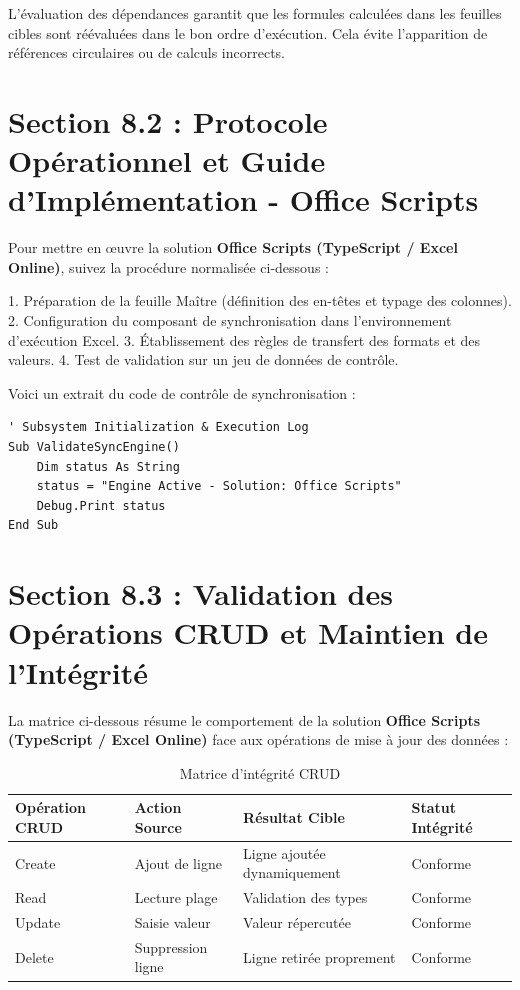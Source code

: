 \documentclass[12pt,a4paper]{report}
\begin{document}
L'évaluation des dépendances garantit que les formules calculées dans les feuilles cibles sont réévaluées dans le bon ordre d'exécution. Cela évite l'apparition de références circulaires ou de calculs incorrects.


\section{Section 8.2 : Protocole Opérationnel et Guide d'Implémentation - Office Scripts}
Pour mettre en œuvre la solution \textbf{Office Scripts (TypeScript / Excel Online)}, suivez la procédure normalisée ci-dessous :

1. Préparation de la feuille Maître (définition des en-têtes et typage des colonnes).
2. Configuration du composant de synchronisation dans l'environnement d'exécution Excel.
3. Établissement des règles de transfert des formats et des valeurs.
4. Test de validation sur un jeu de données de contrôle.

Voici un extrait du code de contrôle de synchronisation :
\begin{lstlisting}[caption=Code de controle operationnel]
' Subsystem Initialization & Execution Log
Sub ValidateSyncEngine()
    Dim status As String
    status = "Engine Active - Solution: Office Scripts"
    Debug.Print status
End Sub
\end{lstlisting}


\section{Section 8.3 : Validation des Opérations CRUD et Maintien de l'Intégrité}
La matrice ci-dessous résume le comportement de la solution \textbf{Office Scripts (TypeScript / Excel Online)} face aux opérations de mise à jour des données :

\begin{table}[h]
\centering
\begin{tabular}{@{}llll@{}}
\toprule
\textbf{Opération CRUD} & \textbf{Action Source} & \textbf{Résultat Cible} & \textbf{Statut Intégrité} \\ \midrule
Create & Ajout de ligne & Ligne ajoutée dynamiquement & Conforme \\
Read & Lecture plage & Validation des types & Conforme \\
Update & Saisie valeur & Valeur répercutée & Conforme \\
Delete & Suppression ligne & Ligne retirée proprement & Conforme \\ \bottomrule
\end{tabular}
\caption{Matrice d'intégrité CRUD}
\end{table}
\end{document}
